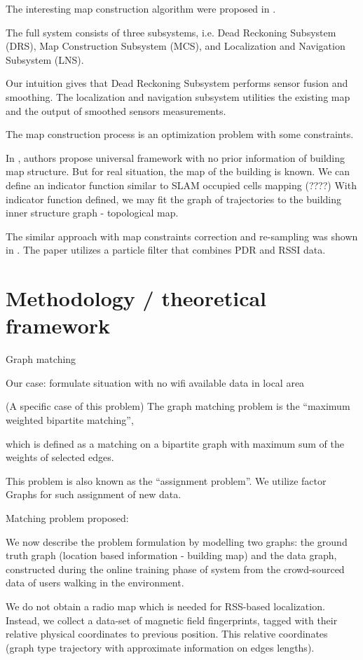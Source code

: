 \documentclass[a4paper, 12pt]{article}
\begin{document}
The interesting map construction algorithm were proposed in \cite{6827640}. 

The full system consists of three subsystems, i.e. Dead Reckoning Subsystem (DRS), Map Construction Subsystem (MCS), and Localization and Navigation Subsystem (LNS). 

Our intuition gives that Dead Reckoning Subsystem performs sensor fusion and smoothing. The localization and navigation subsystem utilities the existing map and the output of smoothed sensors measurements.

The map construction process is an optimization problem with some constraints.

In \cite{6827640}, authors propose universal framework with no prior information of building map structure.
But for real situation, the map of the building is known.
We can define an indicator function similar to SLAM occupied cells mapping (????)
With indicator function defined, we may fit the graph of trajectories to the building inner structure graph - topological map.

The similar approach with map constraints correction and re-sampling was shown in \cite{articleXia}. The paper utilizes a   particle   filter that combines PDR and RSSI data.

\section{Methodology / theoretical framework}

Graph matching

Our case: formulate situation with no wifi available data in local area

(A specific case of this problem) The graph matching problem is the “maximum weighted bipartite matching”,

which is defined as a matching on a bipartite graph with maximum sum of the weights of selected edges.

This problem is also known as the “assignment problem”. We utilize factor Graphs for such assignment of new data.

Matching problem proposed:

We now describe the problem formulation by modelling two graphs: the ground truth graph (location based information - building map) and the data graph, constructed during the online training phase of system from the crowd-sourced data of users walking in the environment.

We do not obtain a radio map which is needed for RSS-based localization. Instead, we collect a data-set of magnetic field fingerprints, tagged with their relative physical coordinates to previous position. This relative coordinates (graph type trajectory with approximate information on edges lengths).
\end{document}

